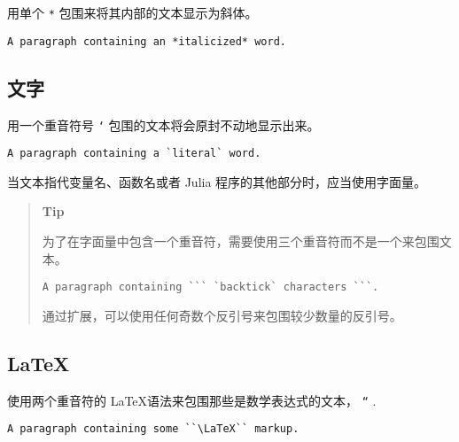 用单个 \texttt{*} 包围来将其内部的文本显示为斜体。




\begin{lstlisting}
A paragraph containing an *italicized* word.
\end{lstlisting}



\hypertarget{3372284496527200906}{}


\subsection{文字}



用一个重音符号 \texttt{`} 包围的文本将会原封不动地显示出来。




\begin{lstlisting}
A paragraph containing a `literal` word.
\end{lstlisting}



当文本指代变量名、函数名或者 Julia 程序的其他部分时，应当使用字面量。



\begin{quote}
\textbf{Tip}

为了在字面量中包含一个重音符，需要使用三个重音符而不是一个来包围文本。


\begin{lstlisting}
A paragraph containing ``` `backtick` characters ```.
\end{lstlisting}

通过扩展，可以使用任何奇数个反引号来包围较少数量的反引号。

\end{quote}


\hypertarget{6917271240677862304}{}


\subsection{ \LaTeX }



使用两个重音符的  \LaTeX  语法来包围那些是数学表达式的文本， \texttt{``} .




\begin{lstlisting}
A paragraph containing some ``\LaTeX`` markup.
\end{lstlisting}



